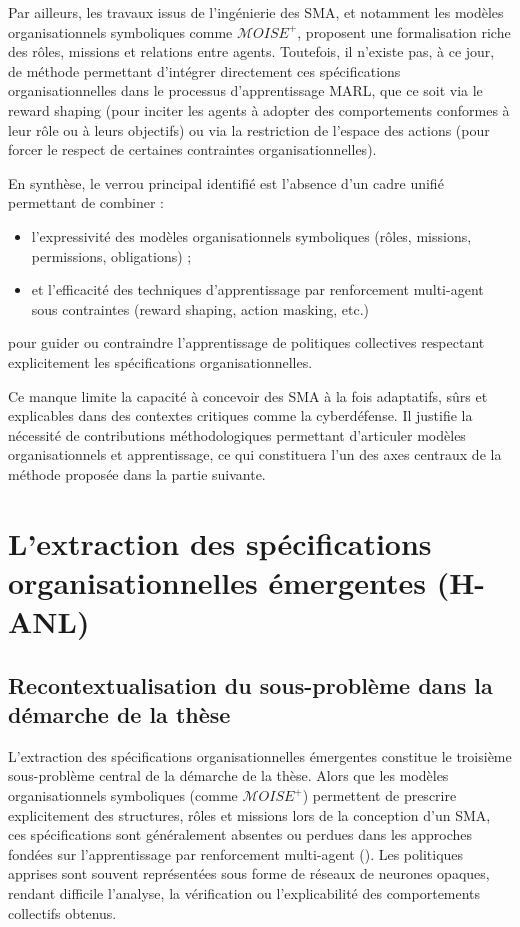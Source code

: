 Par ailleurs, les travaux issus de l’ingénierie des SMA, et notamment les modèles organisationnels symboliques comme $\mathcal{M}OISE^+$, proposent une formalisation riche des rôles, missions et relations entre agents. Toutefois, il n’existe pas, à ce jour, de méthode permettant d’intégrer directement ces spécifications organisationnelles dans le processus d’apprentissage MARL, que ce soit via le reward shaping (pour inciter les agents à adopter des comportements conformes à leur rôle ou à leurs objectifs) ou via la restriction de l’espace des actions (pour forcer le respect de certaines contraintes organisationnelles).

En synthèse, le verrou principal identifié est l’absence d’un cadre unifié permettant de combiner :
\begin{itemize}
  \item l’expressivité des modèles organisationnels symboliques (rôles, missions, permissions, obligations) ;
  \item et l’efficacité des techniques d’apprentissage par renforcement multi-agent sous contraintes (reward shaping, action masking, etc.)
\end{itemize}
pour guider ou contraindre l’apprentissage de politiques collectives respectant explicitement les spécifications organisationnelles.

Ce manque limite la capacité à concevoir des SMA à la fois adaptatifs, sûrs et explicables dans des contextes critiques comme la cyberdéfense. Il justifie la nécessité de contributions méthodologiques permettant d’articuler modèles organisationnels et apprentissage, ce qui constituera l’un des axes centraux de la méthode proposée dans la partie suivante.


\section{L'extraction des spécifications organisationnelles émergentes (H-ANL)}

\subsection*{Recontextualisation du sous-problème dans la démarche de la thèse}

L’extraction des spécifications organisationnelles émergentes constitue le troisième sous-problème central de la démarche de la thèse. Alors que les modèles organisationnels symboliques (comme $\mathcal{M}OISE^+$) permettent de prescrire explicitement des structures, rôles et missions lors de la conception d’un SMA, ces spécifications sont généralement absentes ou perdues dans les approches fondées sur l’apprentissage par renforcement multi-agent (). Les politiques apprises sont souvent représentées sous forme de réseaux de neurones opaques, rendant difficile l’analyse, la vérification ou l’explicabilité des comportements collectifs obtenus.

